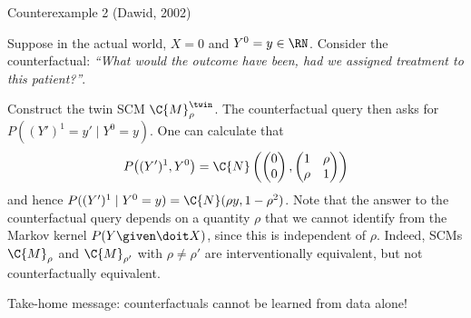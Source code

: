 \begin{frame}{Counterexample 2 (Dawid, 2002)}
\begin{example}[2/2]
  Suppose in the actual world, $X = 0$ and $Y^0 = y \in \RN$.
  Consider the counterfactual: {\it ``What would the outcome have been, had we assigned treatment to this patient?''}.

  Construct the twin SCM $\C{M}_{\rho}^{\twin}$.
The counterfactual query then asks for $P((Y')^1=y'\mid Y^0=y)$. One can calculate that
$$
  P\big((Y')^1,Y^0\big) = \C{N}\left(\begin{pmatrix}0\\ 0\end{pmatrix}, \begin{pmatrix} 1 & \rho \\ \rho & 1 \end{pmatrix}\right)
$$
and hence $P((Y')^1 \mid Y^0=y) = \C{N}(\rho y,1-\rho^2)$. Note that the answer to the counterfactual query depends on a quantity $\rho$ that we cannot identify from the Markov kernel $P(Y\given \doit X)$, since this is independent of $\rho$. 
Indeed, SCMs $\C{M}_{\rho}$ and $\C{M}_{\rho'}$ with $\rho\neq\rho'$ are interventionally equivalent, but not counterfactually equivalent.
\end{example}
  \alert{Take-home message: counterfactuals cannot be learned from data alone!}
\end{frame}

